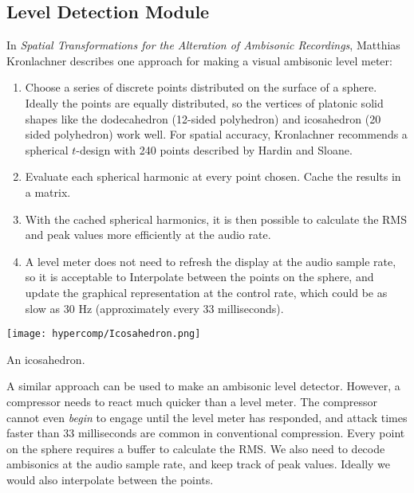 \subsection{Level Detection Module}
\label{sec:an-accurate-level}
In \textit{Spatial Transformations for the Alteration of Ambisonic
  Recordings}, Matthias Kronlachner describes
one approach for making a visual ambisonic level meter:\cite{Kronlachner2014} 
\begin{enumerate}
\item Choose a series of discrete points distributed on the surface of
  a sphere. Ideally the points are equally distributed, so the
  vertices of platonic solid shapes like the dodecahedron (12-sided
  polyhedron) and icosahedron (20 sided polyhedron) work well. For
  spatial accuracy, Kronlachner recommends a spherical $t$-design with
  240 points described by Hardin and Sloane.\cite{Hardin1996}
\item Evaluate each spherical harmonic at every point chosen. Cache
  the results in a matrix. 
\item With the cached spherical harmonics, it is then possible to
  calculate the RMS and peak values more efficiently at the audio
  rate.
\item A level meter does not need to refresh the display at the audio
  sample rate, so it is acceptable to Interpolate between the points
  on the sphere, and update the graphical representation at the
  control rate, which could be as slow as 30 Hz (approximately every
  33 milliseconds).
\end{enumerate}
\begin{marginfigure}
  \texttt{[image: hypercomp/Icosahedron.png]}
  \caption{An icosahedron.}
  \label{fig:icosahedron}
\end{marginfigure}
A similar approach can be used to make an ambisonic level
detector. However, a compressor needs to react much quicker than a
level meter. The compressor cannot even \emph{begin} to engage until
the level meter has responded, and attack times faster than 33
milliseconds are common in conventional compression. Every point on
the sphere requires a buffer to calculate the RMS. We also need to
decode ambisonics at the audio sample rate, and keep track of peak
values. Ideally we would also interpolate between the points.


